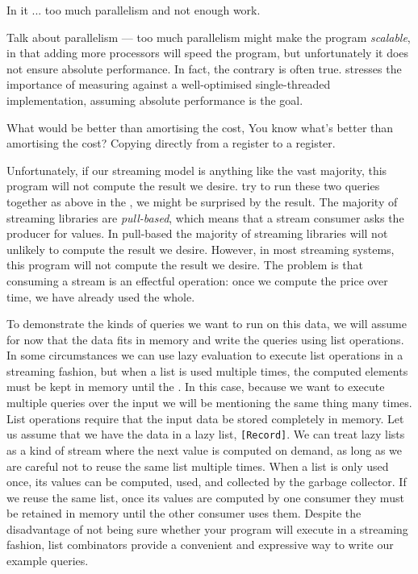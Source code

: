 In \cite{vrba2009evaluating} it ... too much parallelism and not enough work.

Talk about parallelism --- too much parallelism might make the program \emph{scalable}, in that adding more processors will speed the program, but unfortunately it does not ensure absolute performance.
In fact, the contrary is often true.
\cite{mcsherry2015scalability} stresses the importance of measuring against a well-optimised single-threaded implementation, assuming absolute performance is the goal.



What would be better than amortising the cost, 
You know what's better than amortising the cost? Copying directly from a register to a register.




Unfortunately, if our streaming model is anything like the vast majority, this program will not compute the result we desire.
try to run these two queries together as above in the , we might be surprised by the result.
The majority of streaming libraries are \emph{pull-based}, which means that a stream consumer asks the producer for values.
In pull-based
the majority of streaming libraries will not unlikely to compute the result we desire.
However, in most streaming systems, this program will not compute the result we desire.
The problem is that consuming a stream is an effectful operation: once we compute the price over time, we have already used the whole.


To demonstrate the kinds of queries we want to run on this data, we will assume for now that the data fits in memory and write the queries using list operations.
In some circumstances we can use lazy evaluation to execute list operations in a streaming fashion, but when a list is used multiple times, the computed elements must be kept in memory until the .
In this case, because we want to execute multiple queries over the input we will be mentioning the same thing many times.
List operations require that the input data be stored completely in memory.
Let us assume that we have the data in a lazy list, \lstinline/[Record]/.
We can treat lazy lists as a kind of stream where the next value is computed on demand, as long as we are careful not to reuse the same list multiple times.
When a list is only used once, its values can be computed, used, and collected by the garbage collector.
If we reuse the same list, once its values are computed by one consumer they must be retained in memory until the other consumer uses them.
Despite the disadvantage of not being sure whether your program will execute in a streaming fashion, list combinators provide a convenient and expressive way to write our example queries.

